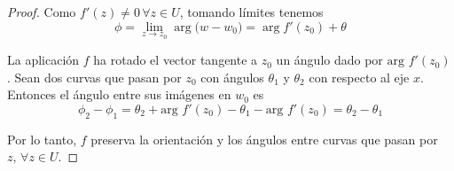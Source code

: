 \begin{proof}
    Como $f'(z) \not = 0 \, \forall z \in U$, tomando límites tenemos
    \begin{equation*}
        \phi = \lim_{z \rightarrow z_0} \arg({w-w_0)}= \arg{f'(z_0)} + \theta
    \end{equation*}

    La aplicación $f$ ha rotado el vector tangente a $z_0$ un ángulo dado por $\text{arg } f'(z_0)$. Sean dos curvas que pasan por $z_0$ con ángulos $\theta_1$ y $\theta_2$ con respecto al eje $x$. Entonces el ángulo entre sus imágenes en $w_0$ es 
    \begin{equation*}
        \phi_2 - \phi_1 = \theta_2 + \text{arg } f'(z_0) - \theta_1 - \text{arg } f'(z_0) = \theta_2 - \theta_1
    \end{equation*}

    Por lo tanto, $f$ preserva la orientación y los ángulos entre curvas que pasan por $z, \, \forall z \in U$.

    \begin{comment}
        $(\Rightarrow)$ Supongamos que $f$ es conforme y que $\frac{\partial f}{\partial x}$ y $\frac{\partial f}{\partial y}$ son continuas. En este caso tenemos
        \begin{equation*}
            w'(t_0) = \dfrac{\partial f}{\partial x} x'(t_0) +  \dfrac{\partial f}{\partial y} y'(t_0)
        \end{equation*}

        Podemos reescribir esto de la siguiente manera
        \begin{equation*}
            w'(t_0) = \dfrac{1}{2} \left( \dfrac{\partial f}{\partial x} - i\dfrac{\partial f}{\partial y} \right) z'(t_0) + \dfrac{1}{2} \left( \dfrac{\partial f}{\partial x} + i\dfrac{\partial f}{\partial y} \right) \xbar{z'(t_0)}
        \end{equation*}

        Si los ángulos se preservan entonces $\arg{(w'(t_0/z'(t_0)))}$ es independiente de $z'(t_0)$. Así,
        \begin{equation*}
            \dfrac{1}{2} \left( \dfrac{\partial f}{\partial x} - i\dfrac{\partial f}{\partial y} \right) + \dfrac{1}{2} \left( \dfrac{\partial f}{\partial x} + i\dfrac{\partial f}{\partial y} \right) \left( \dfrac{\xbar{z'(t_0)}}{z'(t_0)} \right)
        \end{equation*}
        tiene argumento constante.

        Supongamos que $z'(t_0) = re^{i \theta}$. Entonces
        \begin{equation*}
            \dfrac{\xbar{z'(t_0)}}{z'(t_0)} = \dfrac{re^{-i \theta}}{re^{i \theta}} = e^{-2i \theta}
        \end{equation*}

        Mientras $z'(t_0)$ varía, la curva describe una circunferencia de radio $\frac{1}{2} \abs{\frac{\partial f}{\partial x} - i\frac{\partial f}{\partial y}}$. El argumento solo puede ser constante si $\frac{\partial f}{\partial x} - i\frac{\partial f}{\partial y}$ es cero. Como hemos visto, estas ecuaciones implican que es holomorfa.
    \end{comment}
\end{proof}

